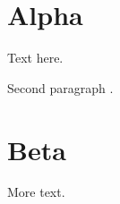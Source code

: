 \documentclass[openany]{amsldoc}
\begin{document}
\tableofcontents
\section{Alpha}
Text  here.

Second paragraph .
\section{Beta}
More  text.
\printindex
\end{document}
